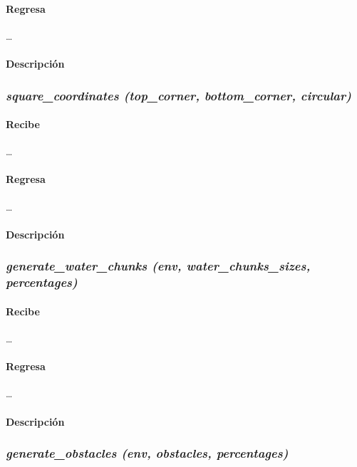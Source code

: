 \documentclass[12pt, letterpaper]{article}
\begin{document}
            \paragraph{Regresa}
            \dots
            \paragraph{Descripción}

        \subsubsection{\textit{square\_coordinates (top\_corner, bottom\_corner, circular)}}

            \paragraph{Recibe}
            \dots
            \paragraph{Regresa}
            \dots
            \paragraph{Descripción}

        \subsubsection{\textit{generate\_water\_chunks (env, water\_chunks\_sizes, percentages)}}

            \paragraph{Recibe}
            \dots
            \paragraph{Regresa}
            \dots
            \paragraph{Descripción}

        \subsubsection{\textit{generate\_obstacles (env, obstacles, percentages)}}
\end{document}
